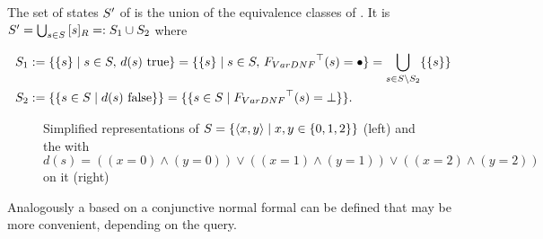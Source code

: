 \documentclass[preview]{standalone}
\begin{document}
The set of states ${S}'$ of \viewparamdnf is the union of the equivalence classes of \eqrelview. It is ${S}' = \bigcup_{{s} \in {S}} {{[{s}]_{{R}}}} =: {S}_1 \cup {S}_2$ where

\begin{align*}
	\states_1 &:= \{\{\state\} \mid \state \in \states, \, d(s) \text{ true}\} = \{\{\state\} \mid \state \in \states, \, \gfctparamdnf(\state) = \remelem\} = \nogroupstates \\
	\states_2 &:= \{\{\state \in \states  \mid d(s) \text{ false}\}\} = \{\{\state \in \states \mid \gfctparamdnf(\state) = \notppty\}\}.
\end{align*}

\begin{figure}[h]
	\begin{minipage}{.6\textwidth}
		
	\end{minipage}%
	\begin{minipage}{.5\textwidth}
		
	\end{minipage}
	\caption{Simplified representations of \mdp ${S} = \{{\langle x,y\rangle} \mid x,y \in \{0, 1, 2\}\}$ (left) and the \viewN \viewparamdnf with $d(s) = ((x=0) \land (y=0)) \lor ((x=1) \land (y=1)) \lor ((x=2) \land (y=2))$  on it (right)}
	\label{fig:varsDnf}  
\end{figure}

Analogously a \viewN based on a conjunctive normal formal can be defined that may be more convenient, depending on the query.
\end{document}
